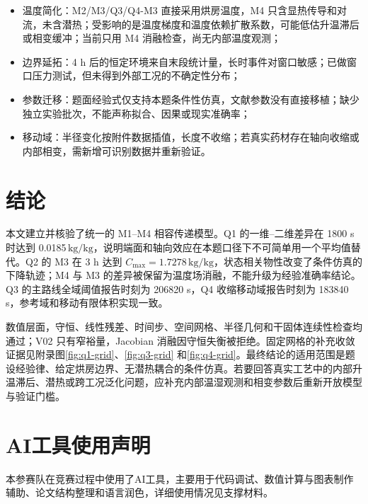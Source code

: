 \documentclass[withoutpreface,bwprint]{cumcmthesis}
\newcommand{\kgkg}{\ensuremath{\mathrm{kg/kg}}}
\newcommand{\Cmax}{C_{\max}}
\begin{document}
\begin{itemize}
  \item 温度简化：M2/M3/Q3/Q4-M3 直接采用烘房温度，M4 只含显热传导和对流，未含潜热；受影响的是温度梯度和温度依赖扩散系数，可能低估升温滞后或相变缓冲；当前只用 M4 消融检查，尚无内部温度观测；
  \item 边界延拓：4 h 后的恒定环境来自末段统计量，长时事件对窗口敏感；已做窗口压力测试，但未得到外部工况的不确定性分布；
  \item 参数迁移：题面经验式仅支持本题条件性仿真，文献参数没有直接移植；缺少独立实验批次，不能声称拟合、因果或现实准确率；
  \item 移动域：半径变化按附件数据插值，长度不收缩；若真实药材存在轴向收缩或内部相变，需新增可识别数据并重新验证。
\end{itemize}

\section{结论}

本文建立并核验了统一的 M1--M4 相容传递模型。Q1 的一维--二维差异在 1800 s 时达到 0.0185\,\kgkg，说明端面和轴向效应在本题口径下不可简单用一个平均值替代。Q2 的 M3 在 3 h 达到 \(\Cmax=1.7278\,\kgkg\)，状态相关物性改变了条件仿真的下降轨迹；M4 与 M3 的差异被保留为温度场消融，不能升级为经验准确率结论。Q3 的主路线全域阈值报告时刻为 206820 s，Q4 收缩移动域报告时刻为 183840 s，参考域和移动有限体积实现一致。

数值层面，守恒、线性残差、时间步、空间网格、半径几何和干固体连续性检查均通过；V02 只有窄裕量，Jacobian 消融因守恒失衡被拒绝。固定网格的补充收敛证据见附录图\cref{fig:q1-grid}、\cref{fig:q3-grid} 和\cref{fig:q4-grid}。最终结论的适用范围是题设经验律、给定烘房边界、无潜热耦合的条件仿真。若要回答真实工艺中的内部升温滞后、潜热或跨工况泛化问题，应补充内部温湿观测和相变参数后重新开放模型与验证门槛。

\section*{AI工具使用声明}

本参赛队在竞赛过程中使用了AI工具，主要用于代码调试、数值计算与图表制作辅助、论文结构整理和语言润色，详细使用情况见支撑材料。
\end{document}
